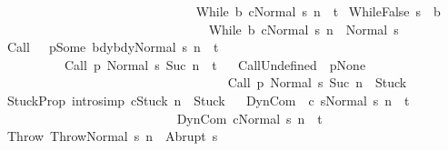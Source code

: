 \begin{isabellebody}
\ \ \ \ \ \ \ \ \ \ \ \ \ \ {\isasymLongrightarrow}\ \ \isanewline
\ \ \ \ \ \ \ \ \ \ \ \ \ \ {\isasymGamma}{\isasymturnstile}{\isasymlangle}While\ b\ c{\isacharcomma}Normal\ s{\isasymrangle}\ {\isacharequal}n{\isasymRightarrow}\ \ t{\isachardoublequoteclose}\isanewline
\isanewline
{\isacharbar}\ WhileFalse{\isacharcolon}\ {\isachardoublequoteopen}{\isasymlbrakk}s\ {\isasymnotin}\ b{\isasymrbrakk}\ \isanewline
\ \ \ \ \ \ \ \ \ \ \ \ \ \ \ {\isasymLongrightarrow}\ \ \isanewline
\ \ \ \ \ \ \ \ \ \ \ \ \ \ \ {\isasymGamma}{\isasymturnstile}{\isasymlangle}While\ b\ c{\isacharcomma}Normal\ s{\isasymrangle}\ {\isacharequal}n{\isasymRightarrow}\ \ Normal\ s{\isachardoublequoteclose}\isanewline
\isanewline
{\isacharbar}\ Call{\isacharcolon}\ \ {\isachardoublequoteopen}{\isasymlbrakk}{\isasymGamma}\ p{\isacharequal}Some\ bdy{\isacharsemicolon}{\isasymGamma}{\isasymturnstile}{\isasymlangle}bdy{\isacharcomma}Normal\ s{\isasymrangle}\ {\isacharequal}n{\isasymRightarrow}\ \ t{\isasymrbrakk}\ \isanewline
\ \ \ \ \ \ \ \ \ \ {\isasymLongrightarrow}\ \isanewline
\ \ \ \ \ \ \ \ \ \ {\isasymGamma}{\isasymturnstile}{\isasymlangle}Call\ p\ {\isacharcomma}Normal\ s{\isasymrangle}\ {\isacharequal}Suc\ n{\isasymRightarrow}\ \ t{\isachardoublequoteclose}\isanewline
\ \isanewline
{\isacharbar}\ CallUndefined{\isacharcolon}\ {\isachardoublequoteopen}{\isasymlbrakk}{\isasymGamma}\ p{\isacharequal}None{\isasymrbrakk}\ \isanewline
\ \ \ \ \ \ \ \ \ \ \ \ \ \ \ \ \ {\isasymLongrightarrow}\ \isanewline
\ \ \ \ \ \ \ \ \ \ \ \ \ \ \ \ \ {\isasymGamma}{\isasymturnstile}{\isasymlangle}Call\ p\ {\isacharcomma}Normal\ s{\isasymrangle}\ {\isacharequal}Suc\ n{\isasymRightarrow}\ \ Stuck{\isachardoublequoteclose}\isanewline
\isanewline
{\isacharbar}\ StuckProp\ {\isacharbrackleft}intro{\isacharcomma}simp{\isacharbrackright}{\isacharcolon}\ {\isachardoublequoteopen}{\isasymGamma}{\isasymturnstile}{\isasymlangle}c{\isacharcomma}Stuck{\isasymrangle}\ {\isacharequal}n{\isasymRightarrow}\ \ Stuck{\isachardoublequoteclose}\isanewline
\ \isanewline
{\isacharbar}\ DynCom{\isacharcolon}\ \ {\isachardoublequoteopen}{\isasymlbrakk}{\isasymGamma}{\isasymturnstile}{\isasymlangle}{\isacharparenleft}c\ s{\isacharparenright}{\isacharcomma}Normal\ s{\isasymrangle}\ {\isacharequal}n{\isasymRightarrow}\ \ t{\isasymrbrakk}\ \isanewline
\ \ \ \ \ \ \ \ \ \ \ \ \ {\isasymLongrightarrow}\ \isanewline
\ \ \ \ \ \ \ \ \ \ \ \ \ {\isasymGamma}{\isasymturnstile}{\isasymlangle}DynCom\ c{\isacharcomma}Normal\ s{\isasymrangle}\ {\isacharequal}n{\isasymRightarrow}\ \ t{\isachardoublequoteclose}\isanewline
\isanewline
{\isacharbar}\ Throw{\isacharcolon}\ {\isachardoublequoteopen}{\isasymGamma}{\isasymturnstile}{\isasymlangle}Throw{\isacharcomma}Normal\ s{\isasymrangle}\ {\isacharequal}n{\isasymRightarrow}\ \ Abrupt\ s{\isachardoublequoteclose}\isanewline

\end{isabellebody}
